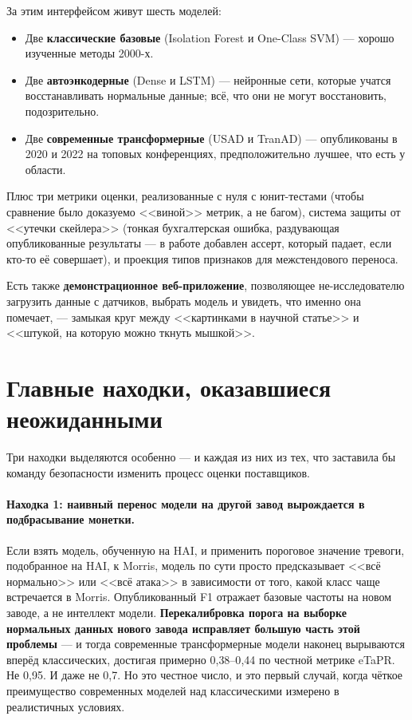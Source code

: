 \documentclass[11pt,a4paper]{article}
\begin{document}
За этим интерфейсом живут шесть моделей:

\begin{itemize}
  \item Две \textbf{классические базовые} (Isolation Forest и One-Class SVM) --- хорошо изученные методы 2000-х.
  \item Две \textbf{автоэнкодерные} (Dense и LSTM) --- нейронные сети, которые учатся восстанавливать нормальные данные; всё, что они не могут восстановить, подозрительно.
  \item Две \textbf{современные трансформерные} (USAD и TranAD) --- опубликованы в 2020 и 2022 на топовых конференциях, предположительно лучшее, что есть у области.
\end{itemize}

Плюс три метрики оценки, реализованные с нуля с юнит-тестами (чтобы сравнение было доказуемо <<виной>> метрик, а не багом), система защиты от <<утечки скейлера>> (тонкая бухгалтерская ошибка, раздувающая опубликованные результаты --- в работе добавлен ассерт, который падает, если кто-то её совершает), и проекция типов признаков для межстендового переноса.

Есть также \textbf{демонстрационное веб-приложение}, позволяющее не-исследователю загрузить данные с датчиков, выбрать модель и увидеть, что именно она помечает, --- замыкая круг между <<картинками в научной статье>> и <<штукой, на которую можно ткнуть мышкой>>.

\section{Главные находки, оказавшиеся неожиданными}

Три находки выделяются особенно --- и каждая из них из тех, что заставила бы команду безопасности изменить процесс оценки поставщиков.

\paragraph{Находка 1: наивный перенос модели на другой завод вырождается в подбрасывание монетки.}
Если взять модель, обученную на HAI, и применить пороговое значение тревоги, подобранное на HAI, к Morris, модель по сути просто предсказывает <<всё нормально>> или <<всё атака>> в зависимости от того, какой класс чаще встречается в Morris. Опубликованный F1 отражает базовые частоты на новом заводе, а не интеллект модели. \textbf{Перекалибровка порога на выборке нормальных данных нового завода исправляет большую часть этой проблемы} --- и тогда современные трансформерные модели наконец вырываются вперёд классических, достигая примерно 0{,}38--0{,}44 по честной метрике eTaPR. Не 0{,}95. И даже не 0{,}7. Но это честное число, и это первый случай, когда чёткое преимущество современных моделей над классическими измерено в реалистичных условиях.
\end{document}
